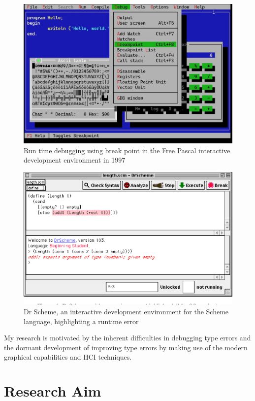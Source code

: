 \begin{figure}[hbt]
  \includegraphics[width=\linewidth]{FreePascal.jpg}
  \caption{
    Run time debugging using break point in the Free Pascal interactive development environment in 1997
    }
\end{figure}

\begin{figure}[hbt]
  \includegraphics[width=\linewidth]{DrScheme}
  \caption{
    Dr Scheme, an interactive development environment for the Scheme language, highlighting a runtime error
    }
\end{figure}

My research is motivated by the inherent difficulties in debugging type errors and the dormant development of improving type errors by making use of the modern graphical capabilities and HCI techniques.

\section{Research Aim}

